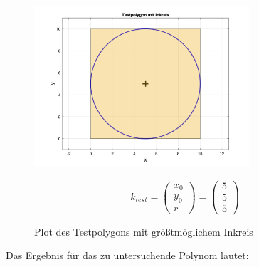 \documentclass[12pt]{scrartcl}
\begin{document}
\begin{figure}[ht]
    \centering
    \begin{minipage}[c]{8cm}
        \includegraphics[width=8cm]{Testpolygon.png}
    \end{minipage}%
    \begin{minipage}[c]{6cm}
        \begin{equation}
            k_{test} = \begin{pmatrix} x_0 \\ y_0 \\ r \end{pmatrix} = \begin{pmatrix} 5 \\ 5 \\ 5 \end{pmatrix}
        \end{equation}
    \end{minipage}
    \caption{Plot des Testpolygons mit größtmöglichem Inkreis}
    \label{fig:Testpolygon}
\end{figure}

Das Ergebnis für das zu untersuchende Polynom lautet:
\end{document}
